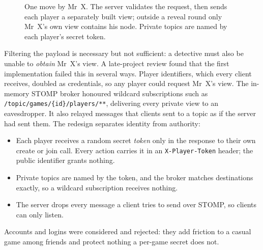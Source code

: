 \documentclass[lettersize,journal]{IEEEtran}
\begin{document}
\begin{figure}[!t]
\centering
{}
\caption{One move by Mr~X. The server validates the request, then sends each player a separately built view; outside a reveal round only Mr~X's own view contains his node. Private topics are named by each player's secret token.}
\label{fig:sequence}
\end{figure}

Filtering the payload is necessary but not sufficient: a detective must also be unable to \emph{obtain} Mr~X's view. A late-project review found that the first implementation failed this in several ways. Player identifiers, which every client receives, doubled as credentials, so any player could request Mr~X's view. The in-memory STOMP broker honoured wildcard subscriptions such as \texttt{/topic/games/\{id\}/players/**}, delivering every private view to an eavesdropper. It also relayed messages that clients sent to a topic as if the server had sent them. The redesign separates identity from authority:
\begin{itemize}
	\item Each player receives a random secret \emph{token} only in the response to their own create or join call. Every action carries it in an \texttt{X-Player-Token} header; the public identifier grants nothing.
	\item Private topics are named by the token, and the broker matches destinations exactly, so a wildcard subscription receives nothing.
	\item The server drops every message a client tries to send over STOMP, so clients can only listen.
\end{itemize}
Accounts and logins were considered and rejected: they add friction to a casual game among friends and protect nothing a per-game secret does not.
\end{document}
